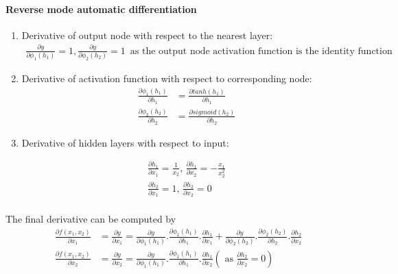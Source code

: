 \documentclass[12pt, letterpaper]{article}
\begin{document}
\paragraph{Reverse mode automatic differentiation}

\begin{enumerate}
\item Derivative of output node with respect to the nearest layer: \\
\begin{align*}
  \frac{\partial y}{\partial \phi_1(h_1)} = 1, 
  \frac{\partial y}{\partial \phi_2(h_2)} = 1 \,
  \text{ as the output node activation function is the identity function}
\end{align*}

\item Derivative of activation function with respect to corresponding node:
\begin{align*}
  \frac{\partial \phi_1(h_1)}{\partial h_1} &= \frac{\partial tanh(h_1)}{\partial h_1} \\
  \frac{\partial \phi_2(h_2)}{\partial h_2} &= \frac{\partial sigmoid(h_2)}{\partial h_2}
\end{align*}

\item Derivative of hidden layers with respect to input:
  
\begin{align*}
  \frac{\partial h_1}{\partial x_1} = \frac{1}{x_2},\,
  \frac{\partial h_1}{\partial x_2} = -\frac{x_1}{x_2^2} \\
  \frac{\partial h_2}{\partial x_1} = 1,\,
  \frac{\partial h_2}{\partial x_2} = 0 \\
\end{align*}
\end{enumerate}

The final derivative can be computed by
\begin{align*}
  \frac{\partial f(x_1, x_2)}{\partial x_1} &= \frac{\partial y}{\partial x_1}
  = \frac{\partial y}{\partial \phi_1(h_1)}.\frac{\partial \phi_1(h_1)}{\partial h_1}.
  \frac{\partial h_1}{\partial x_1} + \frac{\partial y}{\partial \phi_2(h_2)}.
  \frac{\partial \phi_2(h_2)}{\partial h_2}.\frac{\partial h_2}{\partial x_2} \\
  \frac{\partial f(x_1, x_2)}{\partial x_2} &= \frac{\partial y}{\partial x_2}
  = \frac{\partial y}{\partial \phi_1(h_1)}.\frac{\partial \phi_1(h_1)}{\partial h_1}.
  \frac{\partial h_1}{\partial x_2} \left(\text{ as } \frac{\partial h_2}{\partial x_2} = 0 \right)\\
\end{align*}
\end{document}
